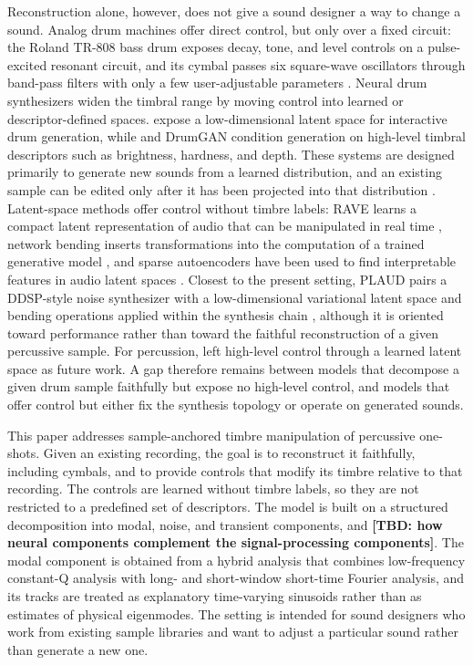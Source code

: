 Reconstruction alone, however, does not give a sound designer a way to change a sound.
Analog drum machines offer direct control, but only over a fixed circuit: the Roland TR-808 bass drum exposes decay, tone, and level controls on a pulse-excited resonant circuit, and its cymbal passes six square-wave oscillators through band-pass filters with only a few user-adjustable parameters \citep{werner2014physically,werner2014tr808}.
Neural drum synthesizers widen the timbral range by moving control into learned or descriptor-defined spaces.
\citet{aouameur2019neural} expose a low-dimensional latent space for interactive drum generation, while \citet{ramires2020neural} and DrumGAN \citep{nistal2020drumgan} condition generation on high-level timbral descriptors such as brightness, hardness, and depth.
These systems are designed primarily to generate new sounds from a learned distribution, and an existing sample can be edited only after it has been projected into that distribution \citep{nistal2022drumganvst}.
Latent-space methods offer control without timbre labels: RAVE learns a compact latent representation of audio that can be manipulated in real time \citep{caillon2021rave}, network bending inserts transformations into the computation of a trained generative model \citep{broad2022network}, and sparse autoencoders have been used to find interpretable features in audio latent spaces \citep{paek2025learning}.
Closest to the present setting, PLAUD pairs a DDSP-style noise synthesizer with a low-dimensional variational latent space and bending operations applied within the synthesis chain \citep{kotowski2026plaud}, although it is oriented toward performance rather than toward the faithful reconstruction of a given percussive sample.
For percussion, \citet{shier2023differentiable} left high-level control through a learned latent space as future work.
A gap therefore remains between models that decompose a given drum sample faithfully but expose no high-level control, and models that offer control but either fix the synthesis topology or operate on generated sounds.

This paper addresses sample-anchored timbre manipulation of percussive one-shots.
Given an existing recording, the goal is to reconstruct it faithfully, including cymbals, and to provide controls that modify its timbre relative to that recording.
The controls are learned without timbre labels, so they are not restricted to a predefined set of descriptors.
The model is built on a structured decomposition into modal, noise, and transient components, and \textbf{[TBD: how neural components complement the signal-processing components]}.
The modal component is obtained from a hybrid analysis that combines low-frequency constant-Q analysis with long- and short-window short-time Fourier analysis, and its tracks are treated as explanatory time-varying sinusoids rather than as estimates of physical eigenmodes.
The setting is intended for sound designers who work from existing sample libraries and want to adjust a particular sound rather than generate a new one.

